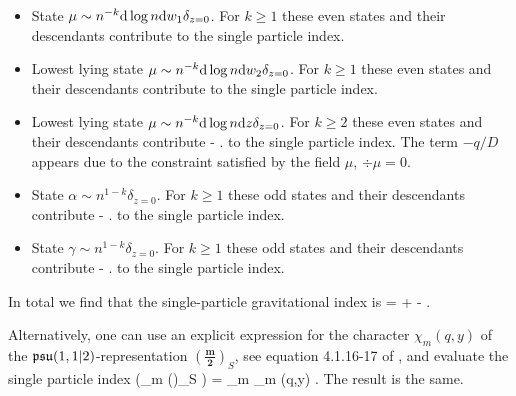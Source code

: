 \documentclass[../main.tex]{subfiles}
\begin{document}
\begin{itemize} 
\item State $\mu \sim n^{-k} \mathrm{d} \log n \mathrm{d} w_1 \delta_{z=0}$.
For $k \geq 1$ these even states and their descendants contribute
\beqn
{} 
\eeqn
to the single particle index. 
\item Lowest lying state $\mu \sim n^{-k} \mathrm{d} \log n \mathrm{d} w_2 \delta_{z=0}$.
For $k \geq 1$ these even states and their descendants contribute
\beqn
{} 
\eeqn
to the single particle index. 
\item Lowest lying state $\mu \sim n^{-k} \mathrm{d} \log n \mathrm{d} z \delta_{z=0}$.
For $k \geq 2$ these even states and their descendants contribute 
\beqn
{} -  .
\eeqn
to the single particle index.
The term $- q / D$ appears due to the constraint satisfied by the field $\mu$, $\div \mu = 0$.
\item State $\alpha \sim n^{1-k}\delta_{z=0}$. 
For $k \geq 1$ these odd states and their descendants contribute 
\beqn
-  .
\eeqn
to the single particle index.
\item State $\gamma \sim n^{1-k}\delta_{z=0}$. 
For $k \geq 1$ these odd states and their descendants contribute 
\beqn
-  .
\eeqn
to the single particle index.
\end{itemize}

In total we find that the single-particle gravitational index is 
\beqn
{} =  +  -  .
\eeqn

Alternatively, one can use an explicit expression for the character $\chi_m(q,y)$ of the $\mathfrak{psu}(1,1|2)$-representation $\left(\mathbf{\frac{m}{2}}\right)_S$, see equation 4.1.16-17 of \cite{CP}, and evaluate the single particle index
\beqn
\chi \left(\oplus_{m } \left(\right)_S  \right) = \sum_{m } \chi_m (q,y) .
\eeqn
The result is the same.

%
\end{document}
